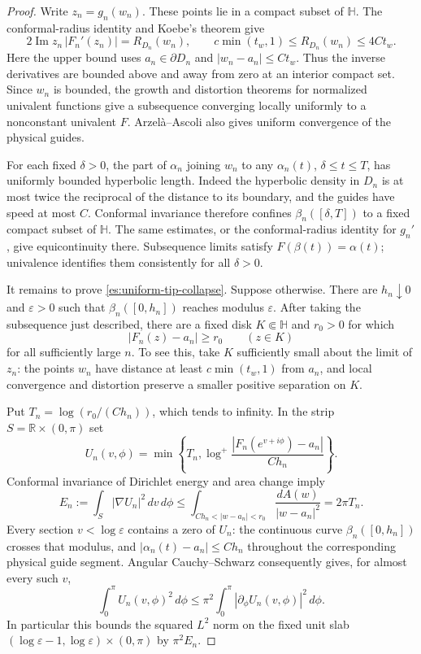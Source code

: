 \begin{proof}
Write $z_n=g_n(w_n)$.  These points lie in a compact subset of
$\mathbb H$.  The conformal-radius identity and Koebe's theorem give
\[
 2\operatorname{Im}z_n\,|F_n'(z_n)|
   =R_{D_n}(w_n),\qquad
 c\min(t_w,1)\le R_{D_n}(w_n)\le4Ct_w.
\]
Here the upper bound uses $a_n\in\partial D_n$ and
$|w_n-a_n|\le Ct_w$.  Thus the inverse derivatives are bounded above
and away from zero at an interior compact set.  Since $w_n$ is bounded,
the growth and distortion theorems for normalized univalent functions
give a subsequence converging locally uniformly to a nonconstant
univalent $F$.  Arzel\`a--Ascoli also gives uniform convergence of the
physical guides.

For each fixed $\delta>0$, the part of $\alpha_n$ joining $w_n$ to any
$\alpha_n(t)$, $\delta\le t\le T$, has uniformly bounded hyperbolic
length.  Indeed the hyperbolic density in $D_n$ is at most twice the
reciprocal of the distance to its boundary, and the guides have speed
at most $C$.  Conformal invariance therefore confines
$\beta_n([\delta,T])$ to a fixed compact subset of $\mathbb H$.
The same estimates, or the conformal-radius identity for $g_n'$,
give equicontinuity there.  Subsequence limits satisfy
$F(\beta(t))=\alpha(t)$; univalence identifies them consistently for
all $\delta>0$.

It remains to prove \eqref{es:uniform-tip-collapse}.  Suppose otherwise.
There are $h_n\downarrow0$ and $\varepsilon>0$ such that
$\beta_n([0,h_n])$ reaches modulus $\varepsilon$.  After taking the
subsequence just described, there are a fixed disk $K\Subset\mathbb H$
and $r_0>0$ for which
\begin{equation}\label{es:waypoint-separation}
 |F_n(z)-a_n|\ge r_0\qquad(z\in K)
\end{equation}
for all sufficiently large $n$.  To see this, take $K$ sufficiently
small about the limit of $z_n$: the points $w_n$ have distance at least
$c\min(t_w,1)$ from $a_n$, and local convergence and distortion preserve
a smaller positive separation on $K$.

Put $T_n=\log(r_0/(Ch_n))$, which tends to infinity.  In the strip
$S=\mathbb R\times(0,\pi)$ set
\[
 U_n(v,\phi)=\min\left\{T_n,
       \log^+\frac{|F_n(e^{v+i\phi})-a_n|}{Ch_n}\right\}.
\]
Conformal invariance of Dirichlet energy and area change imply
\begin{equation}\label{es:collapse-energy}
 E_n:=\int_S|\nabla U_n|^2\,dv\,d\phi
 \le\int_{Ch_n<|w-a_n|<r_0}\frac{dA(w)}{|w-a_n|^2}
 =2\pi T_n.
\end{equation}
Every section $v<\log\varepsilon$ contains a zero of $U_n$:
the continuous curve $\beta_n([0,h_n])$ crosses that modulus, and
$|\alpha_n(t)-a_n|\le Ch_n$ throughout the corresponding physical
guide segment.  Angular Cauchy--Schwarz consequently gives, for almost
every such $v$,
\[
 \int_0^\pi U_n(v,\phi)^2\,d\phi
       \le\pi^2\int_0^\pi|\partial_\phi U_n(v,\phi)|^2\,d\phi.
\]
In particular this bounds the squared $L^2$ norm on the fixed unit
slab $(\log\varepsilon-1,\log\varepsilon)\times(0,\pi)$ by
$\pi^2E_n$.


\end{proof}
